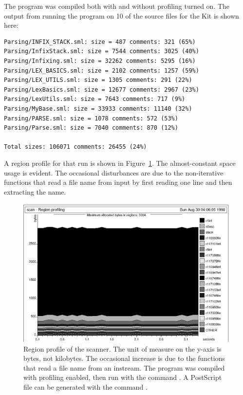 \documentclass[12pt]{book}
\begin{document}
The program was compiled both with and without profiling turned on.
The output from running the program on 10 of the source files for the
Kit is shown here:
\begin{verbatim}
Parsing/INFIX_STACK.sml: size = 487 comments: 321 (65%)
Parsing/InfixStack.sml: size = 7544 comments: 3025 (40%)
Parsing/Infixing.sml: size = 32262 comments: 5295 (16%)
Parsing/LEX_BASICS.sml: size = 2102 comments: 1257 (59%)
Parsing/LEX_UTILS.sml: size = 1305 comments: 291 (22%)
Parsing/LexBasics.sml: size = 12677 comments: 2967 (23%)
Parsing/LexUtils.sml: size = 7643 comments: 717 (9%)
Parsing/MyBase.sml: size = 33933 comments: 11140 (32%)
Parsing/PARSE.sml: size = 1078 comments: 572 (53%)
Parsing/Parse.sml: size = 7040 comments: 870 (12%)

Total sizes: 106071 comments: 26455 (24%)
\end{verbatim}
A region profile for that run is shown in Figure~\ref{scan.fig}.  The
almost-constant space usage is evident. The occasional disturbances
are due to the non-iterative functions that read a file name from
input by first reading one line and then extracting the name.
\begin{figure}
\begin{center}
\includegraphics{scan.ps}
\end{center}
\caption{Region profile of the scanner. The unit of measure on 
  the y-axis is bytes, not kilobytes. The occasional increase is due
  to the functions that read a file name from an instream.  The
  program was compiled with profiling enabled, then run with the
  command . A
  PostScript file  can be generated with the command
  .  }
\label{scan.fig}
\end{figure}
\end{document}

